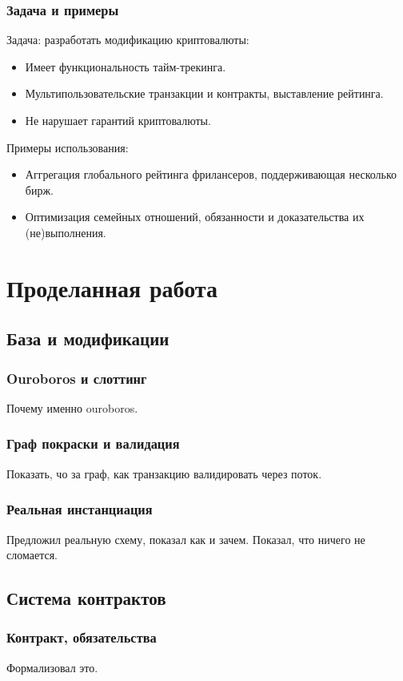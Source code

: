 \documentclass[11pt,handout,pdf,hyperref={unicode}]{beamer}
\begin{document}
\begin{frame}
  \frametitle{Задача и примеры}
  Задача: разработать модификацию криптовалюты:
  \begin{itemize}
  \item Имеет функциональность тайм-трекинга.
  \item Мультипользовательские транзакции и контракты, выставление рейтинга.
  \item Не нарушает гарантий криптовалюты.
  \end{itemize}

  Примеры использования:
  \begin{itemize}
    \item Аггрегация глобального рейтинга фрилансеров, поддерживающая
      несколько бирж.
    \item Оптимизация семейных отношений, обязанности и доказательства
      их (не)выполнения.
  \end{itemize}
\end{frame}

\section{Проделанная работа}

\subsection{База и модификации}

\begin{frame}
  \frametitle{Ouroboros и слоттинг}
  Почему именно ouroboros.
\end{frame}

\begin{frame}
  \frametitle{Граф покраски и валидация }

  Показать, чо за граф, как транзакцию валидировать через поток.
\end{frame}

\begin{frame}
  \frametitle{Реальная инстанциация}

  Предложил реальную схему, показал как и зачем. Показал, что ничего
  не сломается.
\end{frame}

\subsection{Система контрактов}

\begin{frame}
  \frametitle{Контракт, обязательства}

  Формализовал это.
\end{frame}
\end{document}
